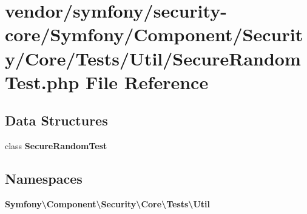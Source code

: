 \section{vendor/symfony/security-\/core/\+Symfony/\+Component/\+Security/\+Core/\+Tests/\+Util/\+Secure\+Random\+Test.php File Reference}
\label{_secure_random_test_8php}
\subsection*{Data Structures}
\begin{DoxyCompactItemize}
\item 
class {\bf Secure\+Random\+Test}
\end{DoxyCompactItemize}
\subsection*{Namespaces}
\begin{DoxyCompactItemize}
\item 
 {\bf Symfony\textbackslash{}\+Component\textbackslash{}\+Security\textbackslash{}\+Core\textbackslash{}\+Tests\textbackslash{}\+Util}
\end{DoxyCompactItemize}
